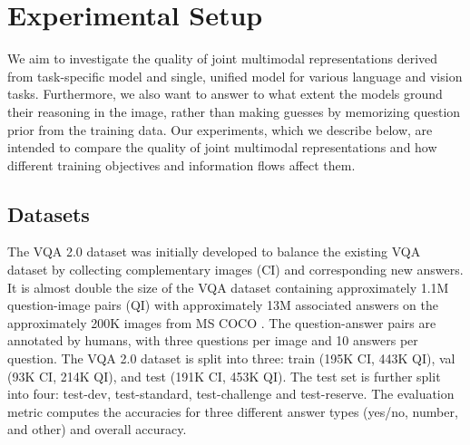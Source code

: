 \documentclass{article}
\begin{document}
\section{Experimental Setup}
We aim to investigate the quality of joint multimodal representations derived from task-specific model and single, unified model for various language and vision tasks. Furthermore, we also want to answer to what extent the models ground their reasoning in the image, rather than making guesses by memorizing question prior from the training data. Our experiments, which we describe below, are intended to compare the quality of joint multimodal representations and how different training objectives and information flows affect them.


\subsection{Datasets} \label{datasets}

The VQA 2.0 dataset \citep{goyal2017vqa2} was initially developed to balance the existing VQA dataset \cite{antol2015vqa} by collecting complementary images (CI) and corresponding new answers. It is almost double the size of the VQA dataset containing approximately 1.1M question-image pairs (QI) with approximately 13M associated answers on the approximately 200K images from MS COCO \citep{coco}. The question-answer pairs are annotated by humans, with three questions per image and 10 answers per question. The VQA 2.0 dataset is split into three: train (195K CI, 443K QI), val (93K CI, 214K QI), and test (191K CI, 453K QI). The test set is further split into four: test-dev, test-standard, test-challenge and test-reserve. The evaluation metric computes the accuracies for three different answer types (yes/no, number, and other) and overall accuracy.
\end{document}
